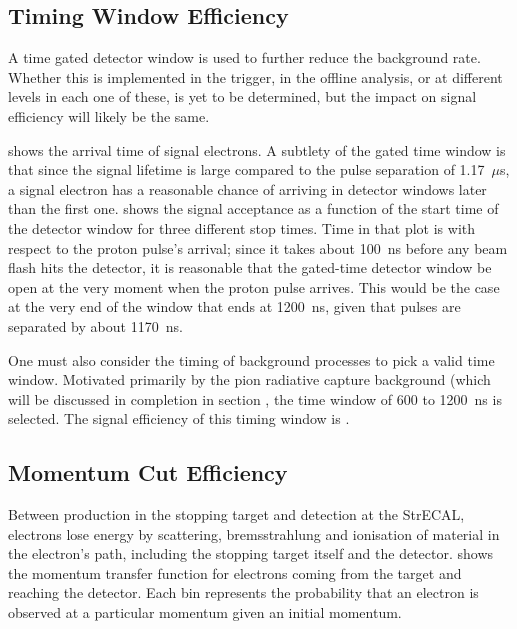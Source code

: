 \subsection{Timing Window Efficiency}
A time gated detector window is used to further reduce the background rate. 
Whether this is implemented in the trigger, in the offline analysis, or at different levels in each one of these, is yet to be determined, but the impact on signal efficiency will likely be the same.
\FigSensTiming

 shows the arrival time of signal electrons.
A subtlety of the gated time window is that since the signal lifetime is large compared to the pulse separation of 1.17~$\mu$s, a signal electron has a reasonable chance of arriving in detector windows later than the first one.
 shows the signal acceptance as a function of the start time of the detector window for three different stop times.
Time in that plot is with respect to the proton pulse's arrival; since it takes about 100~ns before any beam flash hits the detector, it is reasonable that the gated-time detector window be open at the very moment when the proton pulse arrives.
This would be the case at the very end of the window that ends at 1200~ns, given that pulses are separated by about 1170~ns.

One must also consider the timing of background processes to pick a valid time window.
Motivated primarily by the pion radiative capture background (which will be discussed in completion in section , the time window of 600 to 1200~ns is selected.
The signal efficiency of this timing window is \VarAcceptanceTime.

\FigSensMomTransfer
\subsection{Momentum Cut Efficiency}
Between production in the stopping target and detection at the \ac{StrECAL}, electrons lose energy by scattering, bremsstrahlung and ionisation of material in the electron's path, including the stopping target itself and the detector.
 shows the momentum transfer function for electrons coming from the target and reaching the detector.
Each bin represents the probability that an electron is observed at a particular momentum given an initial momentum.
\FigSensMomSpectra

